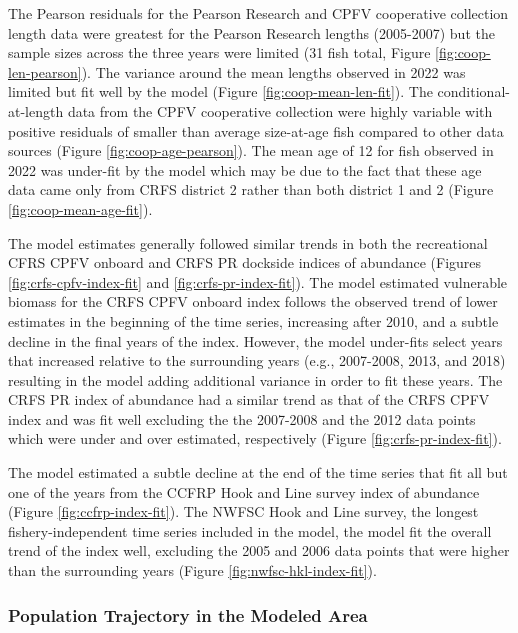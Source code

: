 \documentclass[11pt,
  english,
  letterpaper,
]{article}
\begin{document}
The Pearson residuals for the Pearson Research and CPFV cooperative collection length data were greatest for the Pearson Research lengths (2005-2007) but the sample sizes across the three years were limited (31 fish total, Figure \ref{fig:coop-len-pearson}). The variance around the mean lengths observed in 2022 was limited but fit well by the model (Figure \ref{fig:coop-mean-len-fit}). The conditional-at-length data from the CPFV cooperative collection were highly variable with positive residuals of smaller than average size-at-age fish compared to other data sources (Figure \ref{fig:coop-age-pearson}). The mean age of 12 for fish observed in 2022 was under-fit by the model which may be due to the fact that these age data came only from CRFS district 2 rather than both district 1 and 2 (Figure \ref{fig:coop-mean-age-fit}).

The model estimates generally followed similar trends in both the recreational CFRS CPFV onboard and CRFS PR dockside indices of abundance (Figures \ref{fig:crfs-cpfv-index-fit} and \ref{fig:crfs-pr-index-fit}). The model estimated vulnerable biomass for the CRFS CPFV onboard index follows the observed trend of lower estimates in the beginning of the time series, increasing after 2010, and a subtle decline in the final years of the index. However, the model under-fits select years that increased relative to the surrounding years (e.g., 2007-2008, 2013, and 2018) resulting in the model adding additional variance in order to fit these years. The CRFS PR index of abundance had a similar trend as that of the CRFS CPFV index and was fit well excluding the the 2007-2008 and the 2012 data points which were under and over estimated, respectively (Figure \ref{fig:crfs-pr-index-fit}).

The model estimated a subtle decline at the end of the time series that fit all but one of the years from the CCFRP Hook and Line survey index of abundance (Figure \ref{fig:ccfrp-index-fit}). The NWFSC Hook and Line survey, the longest fishery-independent time series included in the model, the model fit the overall trend of the index well, excluding the 2005 and 2006 data points that were higher than the surrounding years (Figure \ref{fig:nwfsc-hkl-index-fit}).

\hypertarget{population-trajectory-in-the-modeled-area}{%
\subsubsection{Population Trajectory in the Modeled Area}\label{population-trajectory-in-the-modeled-area}}
\end{document}
